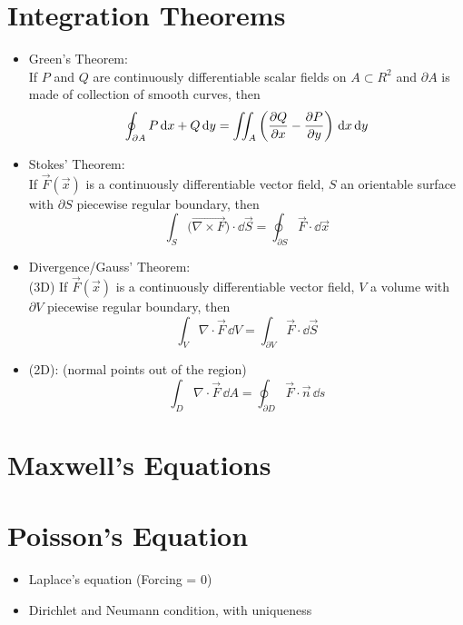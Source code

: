 \section{Integration Theorems}
\begin{itemize}
      \item Green's Theorem: \\
            If $P$ and $Q$ are continuously differentiable scalar fields on $A \subset R^2$ and $\partial A$ is made of collection of smooth curves, then
            \[ \oint_{\partial A} P \, \mathrm{d}{x} + Q \, \mathrm{d} y = \iint_A \left( \frac{\partial{Q}}{\partial{x}} - \frac{\partial{P}}{\partial{y}} \right) \, \mathrm{d} x \, \mathrm{d} y \]

      \item Stokes' Theorem: \\
            If $\vec{F}(\vec{x})$ is a continuously differentiable vector field, $S$ an orientable surface with $\partial S$ piecewise regular boundary, then
            \[\int_S ({\vec{\nabla \times F})\cdot \dd \vec{S} = \oint_{\partial S} \vec{F} \cdot \dd \vec{x}}\]

      \item Divergence/Gauss' Theorem: \\ (3D)
            If $\vec{F}(\vec{x})$ is a continuously differentiable vector field, $V$ a volume with $\partial V$ piecewise regular boundary, then
            \[\int_V \nabla \cdot\vec{F} \, \dd V = \int_{\partial V} \vec{F} \cdot \dd \vec{S}\]

      \item (2D): (normal points out of the region)
            \[ \int_D \nabla \cdot\vec{F} \, \dd A = \oint_{\partial D} \vec{F} \cdot \vec{n} \, \dd s
            \]
\end{itemize}

\section{Maxwell's Equations}
\section{Poisson's Equation}

\begin{itemize}
      \item Laplace's equation (Forcing = 0)
      \item Dirichlet and Neumann condition, with uniqueness
\end{itemize}



